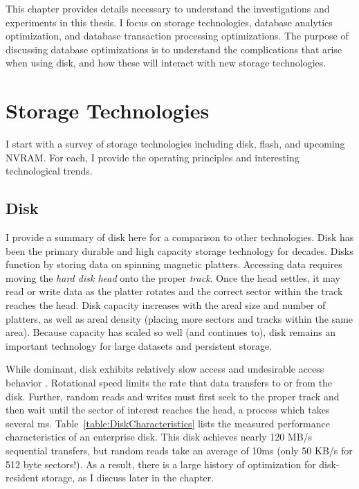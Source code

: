 This chapter provides details necessary to understand the investigations and experiments in this thesis.
I focus on storage technologies, database analytics optimization, and database transaction processing optimizations.
The purpose of discussing database optimizations is to understand the complications that arise when using disk, and how these will interact with new storage technologies.

\section{Storage Technologies}
\label{sec:Background:Storage}

I start with a survey of storage technologies including disk, flash, and upcoming NVRAM.
For each, I provide the operating principles and interesting technological trends.



\subsection{Disk}
\label{sec:Background:Storage:Disk}
I provide a summary of disk here for a comparison to other technologies.
Disk has been the primary durable and high capacity storage technology for decades.
Disks function by storing data on spinning magnetic platters.
Accessing data requires moving the \emph{hard disk head} onto the proper \emph{track}.
Once the head settles, it may read or write data as the platter rotates and the correct sector within the track reaches the head.
Disk capacity increases with the areal size and number of platters, as well as areal density (placing more sectors and tracks within the same area).
Because capacity has scaled so well (and continues to), disk remains an important technology for large datasets and persistent storage.

While dominant, disk exhibits relatively slow access and undesirable access behavior \cite{RuemmlerWilkes94}.
Rotational speed limits the rate that data transfers to or from the disk.
Further, random reads and writes must first seek to the proper track and then wait until the sector of interest reaches the head, a process which takes several ms.
Table~\ref{table:DiskCharacteristics} lists the measured performance characteristics of an enterprise disk.
This disk achieves nearly 120 MB/s sequential transfers, but random reads take an average of 10ms (only 50 KB/s for 512 byte sectors!).
As a result, there is a large history of optimization for disk-resident storage, as I discuss later in the chapter.

